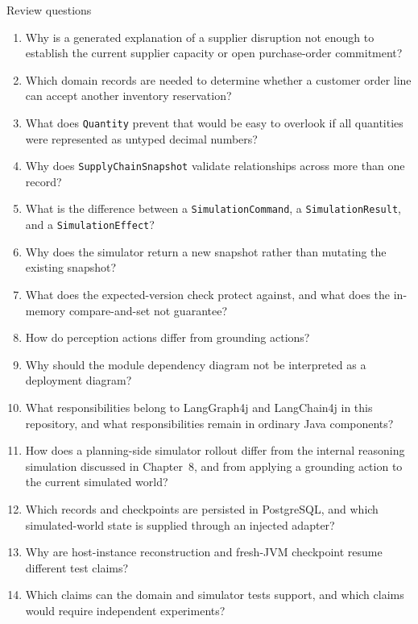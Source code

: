 \begin{reviewquestions}{Review questions}
\begin{enumerate}
  \item Why is a generated explanation of a supplier disruption not enough to establish the current supplier capacity or open purchase-order commitment?
  \item Which domain records are needed to determine whether a customer order line can accept another inventory reservation?
  \item What does \texttt{Quantity} prevent that would be easy to overlook if all quantities were represented as untyped decimal numbers?
  \item Why does \texttt{SupplyChainSnapshot} validate relationships across more than one record?
  \item What is the difference between a \texttt{SimulationCommand}, a \texttt{SimulationResult}, and a \texttt{SimulationEffect}?
  \item Why does the simulator return a new snapshot rather than mutating the existing snapshot?
  \item What does the expected-version check protect against, and what does the in-memory compare-and-set not guarantee?
  \item How do perception actions differ from grounding actions?
  \item Why should the module dependency diagram not be interpreted as a deployment diagram?
  \item What responsibilities belong to LangGraph4j and LangChain4j in this repository, and what responsibilities remain in ordinary Java components?
  \item How does a planning-side simulator rollout differ from the internal reasoning simulation discussed in Chapter~8, and from applying a grounding action to the current simulated world?
  \item Which records and checkpoints are persisted in PostgreSQL, and which simulated-world state is supplied through an injected adapter?
  \item Why are host-instance reconstruction and fresh-JVM checkpoint resume different test claims?
  \item Which claims can the domain and simulator tests support, and which claims would require independent experiments?
\end{enumerate}
\end{reviewquestions}

